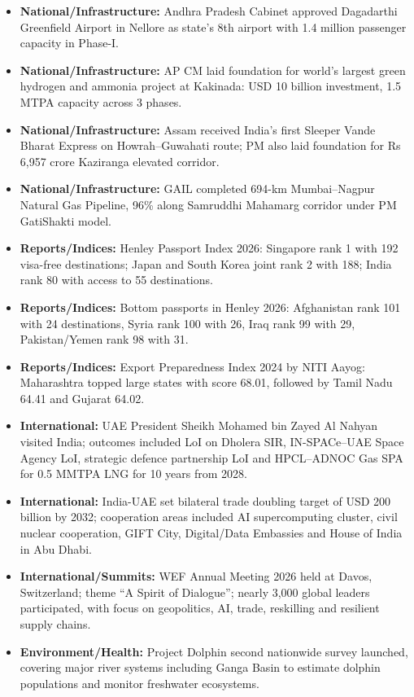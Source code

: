 \documentclass[10pt,a4paper]{article}
\begin{document}
\begin{itemize}
    \item \textbf{National/Infrastructure:} Andhra Pradesh Cabinet approved Dagadarthi Greenfield Airport in Nellore as state's 8th airport with 1.4 million passenger capacity in Phase-I.
    \item \textbf{National/Infrastructure:} AP CM laid foundation for world's largest green hydrogen and ammonia project at Kakinada: USD 10 billion investment, 1.5 MTPA capacity across 3 phases.
    \item \textbf{National/Infrastructure:} Assam received India's first Sleeper Vande Bharat Express on Howrah--Guwahati route; PM also laid foundation for Rs 6,957 crore Kaziranga elevated corridor.
    \item \textbf{National/Infrastructure:} GAIL completed 694-km Mumbai--Nagpur Natural Gas Pipeline, 96\% along Samruddhi Mahamarg corridor under PM GatiShakti model.
    \item \textbf{Reports/Indices:} Henley Passport Index 2026: Singapore rank 1 with 192 visa-free destinations; Japan and South Korea joint rank 2 with 188; India rank 80 with access to 55 destinations.
    \item \textbf{Reports/Indices:} Bottom passports in Henley 2026: Afghanistan rank 101 with 24 destinations, Syria rank 100 with 26, Iraq rank 99 with 29, Pakistan/Yemen rank 98 with 31.
    \item \textbf{Reports/Indices:} Export Preparedness Index 2024 by NITI Aayog: Maharashtra topped large states with score 68.01, followed by Tamil Nadu 64.41 and Gujarat 64.02.
    \item \textbf{International:} UAE President Sheikh Mohamed bin Zayed Al Nahyan visited India; outcomes included LoI on Dholera SIR, IN-SPACe--UAE Space Agency LoI, strategic defence partnership LoI and HPCL--ADNOC Gas SPA for 0.5 MMTPA LNG for 10 years from 2028.
    \item \textbf{International:} India-UAE set bilateral trade doubling target of USD 200 billion by 2032; cooperation areas included AI supercomputing cluster, civil nuclear cooperation, GIFT City, Digital/Data Embassies and House of India in Abu Dhabi.
    \item \textbf{International/Summits:} WEF Annual Meeting 2026 held at Davos, Switzerland; theme ``A Spirit of Dialogue''; nearly 3,000 global leaders participated, with focus on geopolitics, AI, trade, reskilling and resilient supply chains.
    \item \textbf{Environment/Health:} Project Dolphin second nationwide survey launched, covering major river systems including Ganga Basin to estimate dolphin populations and monitor freshwater ecosystems.

\end{itemize}
\end{document}
